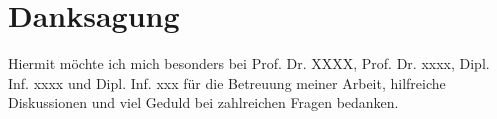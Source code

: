\chapter*{Danksagung}
Hiermit möchte ich mich besonders bei Prof. Dr. XXXX, Prof. Dr. xxxx, Dipl. Inf. xxxx und Dipl. Inf. xxx für die Betreuung meiner Arbeit, hilfreiche Diskussionen und viel Geduld bei zahlreichen Fragen bedanken.